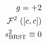\documentclass[preview]{standalone}
\begin{document}
\begin{align*}
\special{dvisvgm:raw <g id='unique000'>}g = +2\\\mathcal{F}^2\text{ }([c,c])\\s_{\text{BRST}}^2 \equiv 0\special{dvisvgm:raw </g>}
\end{align*}
\end{document}

